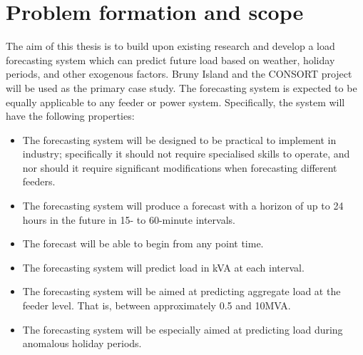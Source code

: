 \section{Problem formation and scope}
\label{scope}
The aim of this thesis is to build upon existing research and develop a load forecasting system which can predict future load based on weather, holiday periods, and other exogenous factors. 
Bruny Island and the CONSORT project will be used as the primary case study. 
The forecasting system is expected to be equally applicable to any feeder or power system.
Specifically, the system will have the following properties:
\begin{itemize}
	\item The forecasting system will be designed to be practical to implement in industry; specifically it should not require specialised skills to operate, and nor should it require significant modifications when forecasting different feeders.
	\item The forecasting system will produce a forecast with a horizon of up to 24 hours in the future in 15- to 60-minute intervals.
	\item The forecast will be able to begin from any point time.
	\item The forecasting system will predict load in kVA at each interval.
	\item The forecasting system will be aimed at predicting aggregate load at the feeder level. That is, between approximately 0.5 and 10MVA.
	\item The forecasting system will be especially aimed at predicting load during anomalous holiday periods.
\end{itemize}
